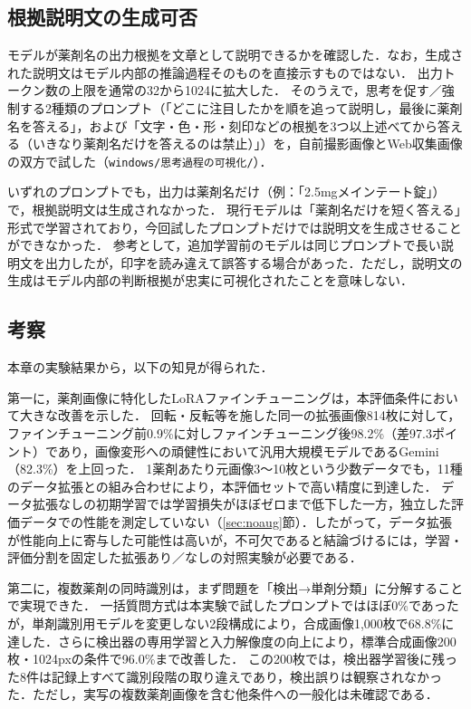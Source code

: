 \documentclass[dvipdfmx]{jsarticle}
\begin{document}
\subsection{根拠説明文の生成可否}\label{sec:reasoning}

モデルが薬剤名の出力根拠を文章として説明できるかを確認した．なお，生成された説明文はモデル内部の推論過程そのものを直接示すものではない．
出力トークン数の上限を通常の32から1024に拡大した．
そのうえで，思考を促す／強制する2種類のプロンプト（「どこに注目したかを順を追って説明し，最後に薬剤名を答える」，および「文字・色・形・刻印などの根拠を3つ以上述べてから答える（いきなり薬剤名だけを答えるのは禁止）」）を，自前撮影画像とWeb収集画像の双方で試した（\texttt{windows/思考過程の可視化/}）．

いずれのプロンプトでも，出力は薬剤名だけ（例：「2.5mgメインテート錠」）で，根拠説明文は生成されなかった．
現行モデルは「薬剤名だけを短く答える」形式で学習されており，今回試したプロンプトだけでは説明文を生成させることができなかった．
参考として，追加学習前のモデルは同じプロンプトで長い説明文を出力したが，印字を読み違えて誤答する場合があった．ただし，説明文の生成はモデル内部の判断根拠が忠実に可視化されたことを意味しない．

\subsection{考察}

本章の実験結果から，以下の知見が得られた．

第一に，薬剤画像に特化したLoRAファインチューニングは，本評価条件において大きな改善を示した．
回転・反転等を施した同一の拡張画像814枚に対して，ファインチューニング前0.9\%に対しファインチューニング後98.2\%（差97.3ポイント）であり，画像変形への頑健性において汎用大規模モデルであるGemini（82.3\%）を上回った．
1薬剤あたり元画像3〜10枚という少数データでも，11種のデータ拡張との組み合わせにより，本評価セットで高い精度に到達した．
データ拡張なしの初期学習では学習損失がほぼゼロまで低下した一方，独立した評価データでの性能を測定していない（\ref{sec:noaug}節）．したがって，データ拡張が性能向上に寄与した可能性は高いが，不可欠であると結論づけるには，学習・評価分割を固定した拡張あり／なしの対照実験が必要である．

第二に，複数薬剤の同時識別は，まず問題を「検出→単剤分類」に分解することで実現できた．
一括質問方式は本実験で試したプロンプトではほぼ0\%であったが，単剤識別用モデルを変更しない2段構成により，合成画像1,000枚で68.8\%に達した．さらに検出器の専用学習と入力解像度の向上により，標準合成画像200枚・1024pxの条件で96.0\%まで改善した．
この200枚では，検出器学習後に残った8件は記録上すべて識別段階の取り違えであり，検出誤りは観察されなかった．ただし，実写の複数薬剤画像を含む他条件への一般化は未確認である．
\end{document}
